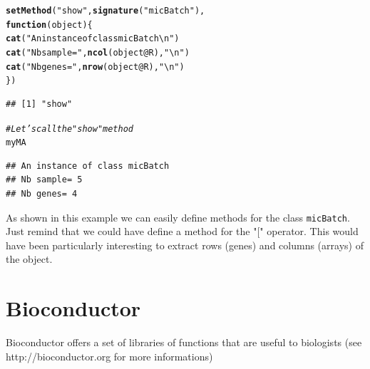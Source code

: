 \documentclass[10pt]{article}\usepackage[]{graphicx}\usepackage[]{color}
\makeatletter
\newcommand{\hlstr}[1]{\textcolor[rgb]{0.192,0.494,0.8}{#1}}%
\newcommand{\hlcom}[1]{\textcolor[rgb]{0.678,0.584,0.686}{\textit{#1}}}%
\newcommand{\hlopt}[1]{\textcolor[rgb]{0,0,0}{#1}}%
\newcommand{\hlstd}[1]{\textcolor[rgb]{0.345,0.345,0.345}{#1}}%
\newcommand{\hlkwa}[1]{\textcolor[rgb]{0.161,0.373,0.58}{\textbf{#1}}}%
\newcommand{\hlkwc}[1]{\textcolor[rgb]{0.333,0.667,0.333}{#1}}%
\newcommand{\hlkwd}[1]{\textcolor[rgb]{0.737,0.353,0.396}{\textbf{#1}}}%
\newenvironment{kframe}{%
 \def\at@end@of@kframe{}%
 \ifinner\ifhmode%
  \def\at@end@of@kframe{\end{minipage}}%
  \begin{minipage}{\columnwidth}%
 \fi\fi%
 \def\FrameCommand##1{\hskip\@totalleftmargin \hskip-\fboxsep
 \colorbox{shadecolor}{##1}\hskip-\fboxsep
     \hskip-\linewidth \hskip-\@totalleftmargin \hskip\columnwidth}%
 \MakeFramed {\advance\hsize-\width
   \@totalleftmargin\z@ \linewidth\hsize
   \@setminipage}}%
 {\par\unskip\endMakeFramed%
 \at@end@of@kframe}
\newenvironment{knitrout}{}{} %
\newcommand{\Rfunction}[1]{{\texttt{#1}}}
\makeatother
\begin{document}
\begin{knitrout}
\begin{kframe}
\begin{alltt}
\hlkwd{setMethod}\hlstd{(}\hlstr{"show"}\hlstd{,} \hlkwd{signature}\hlstd{(}\hlstr{"micBatch"}\hlstd{),}
       \hlkwa{function}\hlstd{(}\hlkwc{object}\hlstd{)\{}
        \hlkwd{cat}\hlstd{(}\hlstr{"An instance of class micBatch\textbackslash{}n"}\hlstd{)}
        \hlkwd{cat}\hlstd{(}\hlstr{"Nb sample="}\hlstd{,} \hlkwd{ncol}\hlstd{(object}\hlopt{@}\hlkwc{R}\hlstd{),}\hlstr{"\textbackslash{}n"}\hlstd{)}
        \hlkwd{cat}\hlstd{(}\hlstr{"Nb genes="}\hlstd{,} \hlkwd{nrow}\hlstd{(object}\hlopt{@}\hlkwc{R}\hlstd{),}\hlstr{"\textbackslash{}n"}\hlstd{)}
\hlstd{\})}
\end{alltt}
\begin{verbatim}
## [1] "show"
\end{verbatim}
\begin{alltt}
\hlcom{# Let's call the "show" method}
\hlstd{myMA}
\end{alltt}
\begin{verbatim}
## An instance of class micBatch
## Nb sample= 5 
## Nb genes= 4
\end{verbatim}
\end{kframe}
\end{knitrout}

As shown in this example we can easily define methods for the class \Rfunction{micBatch}. Just remind that we could have define a method for the "[" operator. This would have been particularly interesting to extract rows (genes) and columns (arrays) of the object.


\section{Bioconductor}
Bioconductor offers a set of libraries of functions that are useful to biologists (see http://bioconductor.org for more informations)
\end{document}

